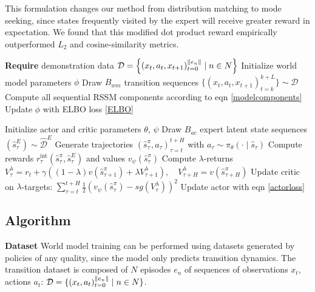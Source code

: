 \documentclass[10pt]{article} %
\DeclarePairedDelimiter{\norm}{\lVert}{\rVert}
\theoremstyle{plain}
\theoremstyle{definition}
\theoremstyle{remark}
\begin{document}
This formulation changes our method from distribution matching to mode seeking, since states frequently visited by the expert will receive greater reward in expectation. We found that this modified dot product reward empirically outperformed $L_2$ and cosine-similarity metrics.

\begin{algorithm}
    \caption{Dream Imitation (DITTO)}
    \label{DreamImitation}
    \begin{algorithmic}[1] %
        \State \textbf{Require} demonstration data $\mathcal{D} = \left\{ (x_t, a_t, x_{t+1})_{t=0}^{\norm{e_n}} \mid n \in N\right\}$
        \State Initialize world model parameters $\phi$
         
            \State Draw $B_{wm}$ transition sequences $\{ (x_t, a_t, x_{t+1})_{t=k}^{k+L}\} \sim \mathcal{D}$
            \State Compute all sequential RSSM components according to eqn \ref{modelcomponents}
            \State Update $\phi$ with ELBO loss \ref{ELBO}
        \EndWhile

        \State Initialize actor and critic parameters $\theta$, $\psi$
         
            \State Draw $B_{ac}$ expert latent state sequences $(\hat{s}^E_\tau) \sim \hat{\mathcal{D}}^E$
            \State Generate trajectories $(\hat{s}^\pi_\tau, a_\tau)_{\tau =t}^{t+H}$ with $a_\tau \sim \pi_\theta(\cdot\mid \hat{s}_\tau)$
            \State Compute rewards $r^\text{int}_\tau(\hat{s}^\pi_\tau, \hat{s}^E_\tau)$ and values $v_\psi(\hat{s}^\pi_\tau)$
            \State Compute $\lambda$-returns $V^{\lambda}_\tau = r_t + \gamma \left( (1-\lambda)v(\hat{s}^\pi_{\tau+1}) + \lambda V^\lambda_{\tau+1}\right), \quad V^\lambda_{\tau+H} = v(\hat{s}^\pi_{\tau+H})$
            \State Update critic on $\lambda$-targets: $\sum_{\tau=t}^{t+H}\tfrac{1}{2} ( v_\psi(\hat{s}^\pi_\tau) - sg(V^\lambda_\tau))^2$
            \State Update actor with eqn \ref{actorloss}
            
        \EndWhile
    \end{algorithmic}
\end{algorithm}

\subsection{Algorithm}\label{agenttheory}
\textbf{Dataset} \hspace{0.3cm} World model training can be performed using datasets generated by policies of any quality, since the model only predicts transition dynamics. The transition dataset is composed of $N$ episodes $e_n$ of sequences of observations $x_t$, actions $a_t$: $\mathcal{D} = \{ (x_t, a_t)_{t=0}^{\norm{e_n}} \mid n \in N\}$.
\end{document}
